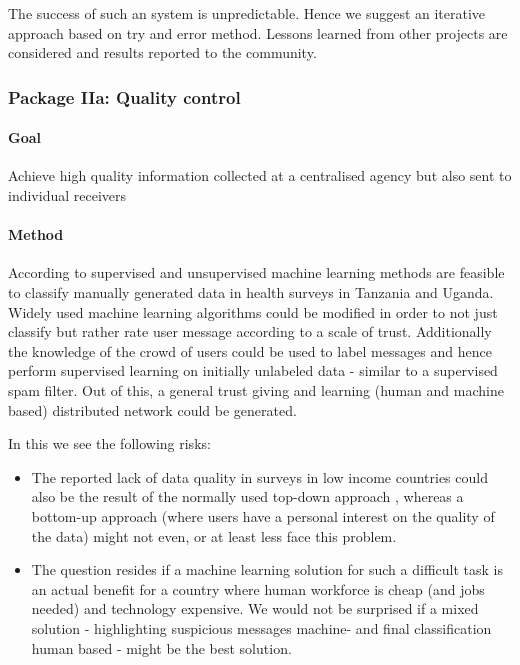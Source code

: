 \documentclass[11pt]{article}
\begin{document}
The success of such an system is unpredictable. Hence we suggest an iterative approach based on try and error method. Lessons learned from other projects are considered and results reported to the community.



\subsubsection*{Package IIa: Quality control}
\paragraph{Goal} Achieve high quality information collected at a centralised agency but also sent to individual receivers 
\paragraph{Method} According to \cite{birnbaum2012automated} supervised and unsupervised machine learning methods are feasible to classify manually generated data in health surveys in Tanzania and Uganda. Widely used machine learning algorithms could be modified in order to not just classify but rather rate user message according to a scale of trust. Additionally the knowledge of the crowd of users could be used to label messages and hence perform supervised learning on initially unlabeled data - similar to a supervised spam filter. Out of this, a general trust giving and learning (human and machine based) distributed network could be generated.

In this we see the following risks:

\begin{itemize}
 \item The reported lack of data quality in surveys in low income countries could also be the result of the normally used top-down approach \cite{birnbaum2012automated}, whereas a bottom-up approach  (where users have a personal interest on the quality of the data) might not even, or at least less face this problem.
 \item The question resides if a machine learning solution for such a difficult task is an actual benefit for a country where human workforce is cheap (and jobs needed) and technology expensive. We would not be surprised if a mixed solution - highlighting suspicious messages machine- and final classification human based - might be the best solution.
\end{itemize}
\end{document}
